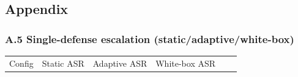 \documentclass[

]{article}
\newcounter{none} %
\begin{document}
\subsection{Appendix}\label{appendix}



\subsubsection{A.5 Single-defense escalation (static/adaptive/white-box)}\label{a.5-single-defense-escalation-staticadaptivewhite-box}



{\def\LTcaptype{none} %

\begin{longtable}[]{@{}

  >{\raggedright\arraybackslash}p{}

  >{\raggedright\arraybackslash}p{}

  >{\raggedright\arraybackslash}p{}

  >{\raggedright\arraybackslash}p{}

  >{\raggedright\arraybackslash}p{}

  >{\raggedright\arraybackslash}p{}@{}}

\toprule\noalign{}

\begin{minipage}[b]{\linewidth}\raggedright

Config

\end{minipage} & \begin{minipage}[b]{\linewidth}\raggedright

Static ASR

\end{minipage} & \begin{minipage}[b]{\linewidth}\raggedright

Adaptive ASR

\end{minipage} & \begin{minipage}[b]{\linewidth}\raggedright

White-box ASR

\end{minipage} & \begin{minipage}[b]{\linewidth}\raggedright


\end{minipage}
\end{longtable}}
\end{document}
